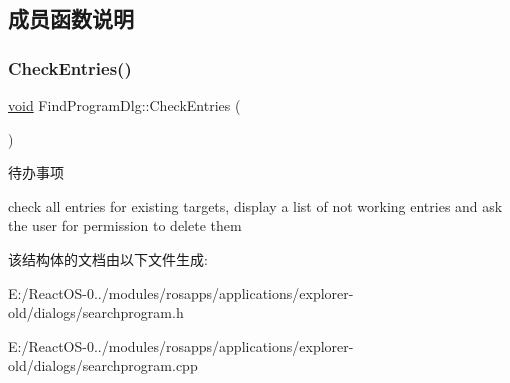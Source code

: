 \subsection{成员函数说明}
\mbox{\label{struct_find_program_dlg_a8e701c215c3eae3295f2b1697f8fb9a8}} 
\subsubsection{\texorpdfstring{Check\+Entries()}{CheckEntries()}}
{\footnotesize\ttfamily \hyperlink{interfacevoid}{void} Find\+Program\+Dlg\+::\+Check\+Entries (\begin{DoxyParamCaption}{ }\end{DoxyParamCaption})\hspace{0.3cm}{\ttfamily [protected]}}

\begin{DoxyRefDesc}{待办事项}
\item[\hyperlink{todo__todo000017}{待办事项}]check all entries for existing targets, display a list of not working entries and ask the user for permission to delete them \end{DoxyRefDesc}


该结构体的文档由以下文件生成\+:\begin{DoxyCompactItemize}
\item 
E\+:/\+React\+O\+S-\/0../modules/rosapps/applications/explorer-\/old/dialogs/searchprogram.\+h\item 
E\+:/\+React\+O\+S-\/0../modules/rosapps/applications/explorer-\/old/dialogs/searchprogram.\+cpp\end{DoxyCompactItemize}
